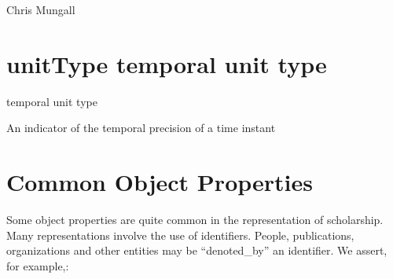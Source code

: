 \documentclass[letterpaper,10pt,english]{sphinxmanual}
\begin{document}
\begin{sphinxShadowBox}

\sphinxAtStartPar
Chris Mungall
\end{sphinxShadowBox}
\begin{quote}
\label{\detokenize{doc-unitType:unittype}}\label{\detokenize{doc-unitType:temporal-unit-type}}\label{\detokenize{doc-unitType:unittype}}
\ignorespaces \end{quote}


\section{unitType \sphinxhyphen{} temporal unit type}
\label{\detokenize{doc-unitType:unittype-temporal-unit-type}}\label{\detokenize{doc-unitType:index-0}}\label{\detokenize{doc-unitType::doc}}
\begin{sphinxShadowBox}

\sphinxAtStartPar
temporal unit type
\end{sphinxShadowBox}

\begin{sphinxShadowBox}

\sphinxAtStartPar
An indicator of the temporal precision of a time instant
\end{sphinxShadowBox}

\begin{sphinxShadowBox}

\sphinxAtStartPar
{}
\end{sphinxShadowBox}


\section{Common Object Properties}
\label{\detokenize{object-properties:common-object-properties}}
\sphinxAtStartPar
Some object properties are quite common in the representation of scholarship.  Many
representations involve the use of identifiers.  People, publications, organizations
and other entities may be “denoted\_by” an identifier.  We assert, for example,:

\begin{sphinxVerbatim}[commandchars=\\\{\}]
  
  
  
\end{sphinxVerbatim}
\end{document}
